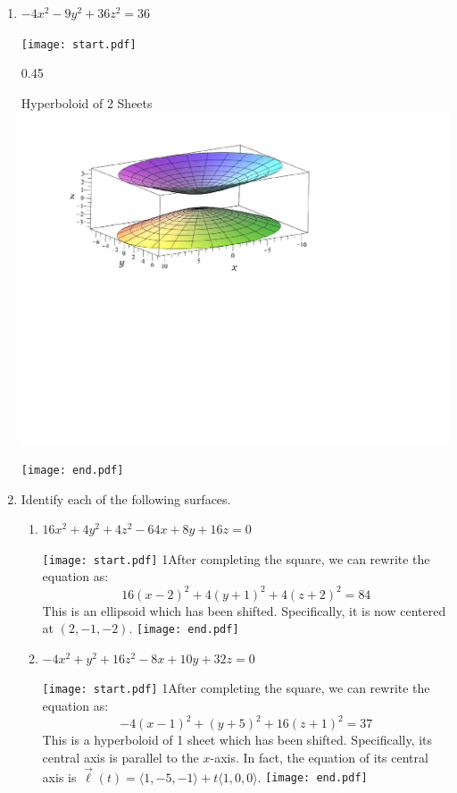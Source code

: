 \documentclass[12pt]{article}
\begin{document}
\begin{enumerate}
\item $-4x^2-9y^2+36z^2=36$

\texttt{[image: start.pdf]}
{{{0.45\linewidth}{\begin{center}Hyperboloid of 2 Sheets\\\includegraphics[scale=0.4]{hyperboloid3.pdf}\end{center}}}}
\texttt{[image: end.pdf]}


\item Identify each of the following surfaces.

\begin{enumerate}

\item  $16x^2+4y^2+4z^2-64x+8y+16z=0$

\texttt{[image: start.pdf]}
{{{1\linewidth}{After completing the square, we can rewrite the equation as: $$16(x-2)^2+4(y+1)^2+4(z+2)^2=84$$
This is an ellipsoid which has been shifted.  Specifically, it is now centered at $(2,-1,-2)$.
}}}
\texttt{[image: end.pdf]}


\item $-4x^2+y^2+16z^2-8x+10y+32z=0$

\texttt{[image: start.pdf]}
{{{1\linewidth}{After completing the square, we can rewrite the equation as: $$-4(x-1)^2+(y+5)^2+16(z+1)^2=37$$
This is a hyperboloid of 1 sheet which has been shifted.  Specifically, its central axis is parallel to the $x$-axis.  In fact, the equation of its central axis is $\overrightarrow{\ell}(t)=\langle 1,-5,-1 \rangle +t \langle 1, 0, 0 \rangle$.
}}}
\texttt{[image: end.pdf]}



\end{enumerate}
\end{enumerate}
\end{document}
